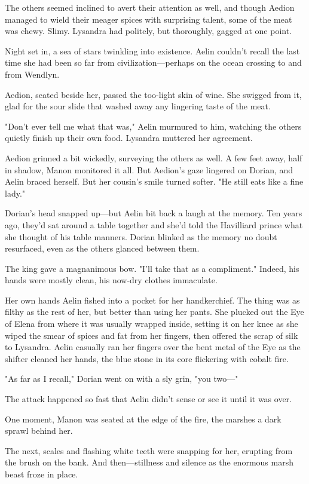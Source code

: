 The others seemed inclined to avert their attention as well, and though Aedion managed to wield their meager spices with surprising talent, some of the meat was  chewy. Slimy. Lysandra had politely, but thoroughly, gagged at one point.

Night set in, a sea of stars twinkling into existence. Aelin couldn't recall the last time she had been so far from civilization---perhaps on the ocean crossing to and from Wendlyn.

Aedion, seated beside her, passed the too-light skin of wine. She swigged from it, glad for the sour slide that washed away any lingering taste of the meat.

"Don't ever tell me what that was," Aelin murmured to him, watching the others quietly finish up their own food. Lysandra muttered her agreement.

Aedion grinned a bit wickedly, surveying the others as well. A few feet away, half in shadow, Manon monitored it all. But Aedion's gaze lingered on Dorian, and Aelin braced herself. But her cousin's smile turned softer. "He still eats like a fine lady."

Dorian's head snapped up---but Aelin bit back a laugh at the memory. Ten years ago, they'd sat around a table together and she'd told the Havilliard prince what she thought of his table manners. Dorian blinked as the memory no doubt resurfaced, even as the others glanced between them.

The king gave a magnanimous bow. "I'll take that as a compliment." Indeed, his hands were mostly clean, his now-dry clothes immaculate.

Her own hands  Aelin fished into a pocket for her handkerchief. The thing was as filthy as the rest of her, but  better than using her pants. She plucked out the Eye of Elena from where it was usually wrapped inside, setting it on her knee as she wiped the smear of spices and fat from her fingers, then offered the scrap of silk to Lysandra. Aelin casually ran her fingers over the bent metal of the Eye as the shifter cleaned her hands, the blue stone in its core flickering with cobalt fire.

"As far as I recall," Dorian went on with a sly grin, "you two---"

The attack happened so fast that Aelin didn't sense or see it until it was over.

One moment, Manon was seated at the edge of the fire, the marshes a dark sprawl behind her.

The next, scales and flashing white teeth were snapping for her, erupting from the brush on the bank. And then---stillness and silence as the enormous marsh beast froze in place.

